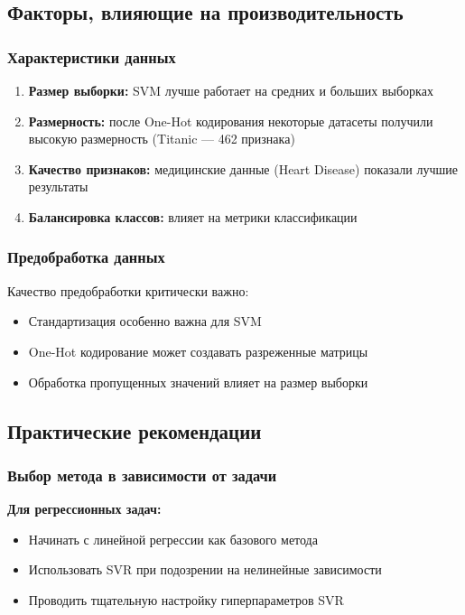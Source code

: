 \documentclass[a4paper]{article}
\begin{document}
\subsection{Факторы, влияющие на производительность}

\subsubsection{Характеристики данных}
\begin{enumerate}
    \item \textbf{Размер выборки:} SVM лучше работает на средних и больших выборках
    \item \textbf{Размерность:} после One-Hot кодирования некоторые датасеты получили высокую размерность (Titanic — 462 признака)
    \item \textbf{Качество признаков:} медицинские данные (Heart Disease) показали лучшие результаты
    \item \textbf{Балансировка классов:} влияет на метрики классификации
\end{enumerate}

\subsubsection{Предобработка данных}
Качество предобработки критически важно:
\begin{itemize}
    \item Стандартизация особенно важна для SVM
    \item One-Hot кодирование может создавать разреженные матрицы
    \item Обработка пропущенных значений влияет на размер выборки
\end{itemize}

\subsection{Практические рекомендации}

\subsubsection{Выбор метода в зависимости от задачи}

\textbf{Для регрессионных задач:}
\begin{itemize}
    \item Начинать с линейной регрессии как базового метода
    \item Использовать SVR при подозрении на нелинейные зависимости
    \item Проводить тщательную настройку гиперпараметров SVR
\end{itemize}
\end{document}
